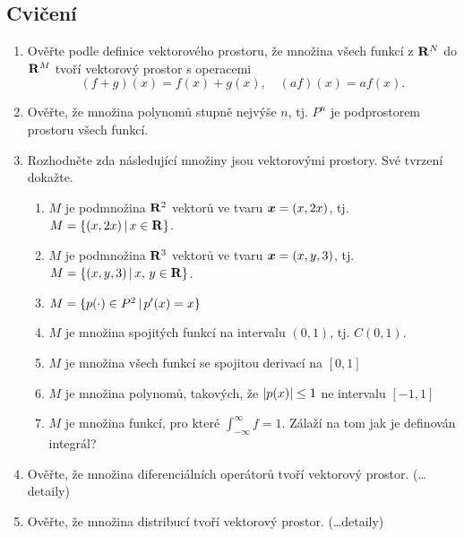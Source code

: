 \subsection{Cvičení}
\begin{enumerate}
 \item Ověřte podle definice vektorového prostoru, že množina všech  funkcí z ${\rm\bf R}^N$ do ${\rm\bf R}^M$ tvoří vektorový prostor s operacemi
  \[
      (f + g)(x) = f(x)+g(x),\quad (af)(x) = af(x).
  \]
 \item Ověřte, že množina polynomů stupně nejvýše $n$, tj. $P^n$ je podprostorem prostoru všech funkcí.
 \item Rozhodněte zda následující množiny jsou vektorovými prostory. Své tvrzení dokažte.
 \begin{enumerate}
        \item $M$ je podmnožina ${\rm\bf R}^2$ vektorů ve tvaru $\mathbf{\boldsymbol{x}}=(x,2x)$, tj. $M=\{(x,2x)\,|\, x\in {\rm\bf R}\}$.
        \item $M$ je podmnožina ${\rm\bf R}^3$ vektorů ve tvaru $\mathbf{\boldsymbol{x}}=(x,y,3)$, tj. $M=\{(x,y,3)\,|\, x,\,y\in {\rm\bf R}\}$.
        \item $M = \{p(\cdot) \in P^2\,|\, p'(x) = x\}$
        \item $M$ je množina spojitých funkcí na intervalu $(0,1)$, tj. $C(0,1)$.
        \item $M$ je množina všech funkcí se spojitou derivací na $[0,1]$
        \item $M$ je množina polynomů, takových, že  $\lvert p(x)\rvert\le 1$ ne intervalu $[-1, 1]$
        \item $M$ je množina funkcí, pro které $\int_{-\infty}^{\infty} f =1$. Zálaží na tom jak je definován integrál?
         
\end{enumerate}
\item Ověřte, že množina diferenciálních operátorů tvoří vektorový prostor. (\dots detaily)
\item Ověřte, že množina distribucí tvoří vektorový prostor. (\dots detaily)
\end{enumerate}


